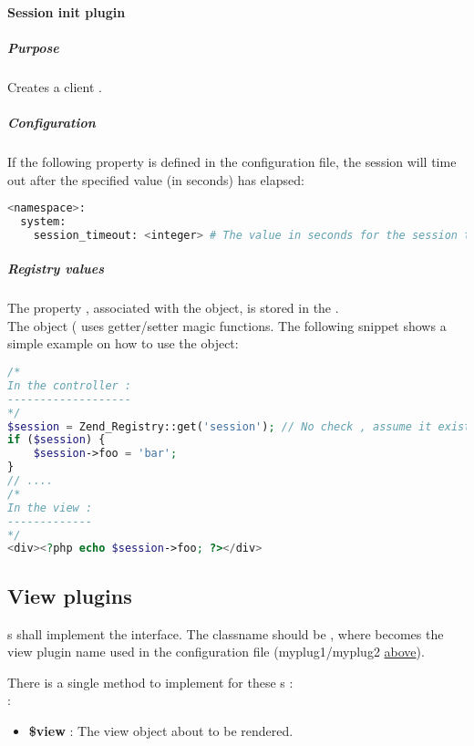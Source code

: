 \documentclass[pdftex,12pt,a4paper]{article}
\begin{document}
\paragraph{Session init plugin} \label{sec:session-init-plugin}
\subparagraph{Purpose}
Creates a client .
\subparagraph{Configuration}
If the following property is defined in the configuration file, the session will time out after the specified value (in seconds) has elapsed:
\begin{lstlisting}[label="sesion-config",caption="Session config",language=bash]
<namespace>:
  system:
    session_timeout: <integer> # The value in seconds for the session timeout
\end{lstlisting}
\subparagraph{Registry values}
The  property , associated with the  object, is stored in the .\\
The  object ( uses getter/setter magic functions. The following snippet shows a simple example on how to use the  object:
\begin{lstlisting}[label="session-code-sample",caption="Code using session",language=PHP]
/*
In the controller :
-------------------
*/
$session = Zend_Registry::get('session'); // No check , assume it exists. In reality, isRegistered should be used.
if ($session) {
	$session->foo = 'bar';
}
// ....
/*
In the view :
-------------
*/
<div><?php echo $session->foo; ?></div>
\end{lstlisting}

\subsection{View plugins} \label{sec:view-plugins}

s shall implement the  interface. The classname should be , where  becomes the view plugin name used in the configuration file (\eg myplug1/myplug2 \hyperref[code:plugin-config]{above}).

There is a single method to implement for these s :\\
 :
\begin{itemize}
	\item \textbf{\$view} : The view object about to be rendered.
\end{itemize}
\end{document}
